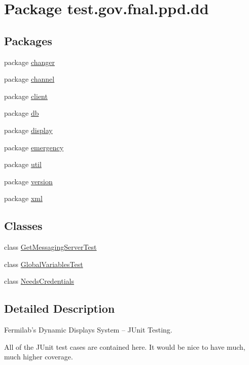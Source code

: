 \hypertarget{namespacetest_1_1gov_1_1fnal_1_1ppd_1_1dd}{\section{Package test.\-gov.\-fnal.\-ppd.\-dd}
\label{namespacetest_1_1gov_1_1fnal_1_1ppd_1_1dd}
}
\subsection*{Packages}
\begin{DoxyCompactItemize}
\item 
package \hyperlink{namespacetest_1_1gov_1_1fnal_1_1ppd_1_1dd_1_1changer}{changer}
\item 
package \hyperlink{namespacetest_1_1gov_1_1fnal_1_1ppd_1_1dd_1_1channel}{channel}
\item 
package \hyperlink{namespacetest_1_1gov_1_1fnal_1_1ppd_1_1dd_1_1client}{client}
\item 
package \hyperlink{namespacetest_1_1gov_1_1fnal_1_1ppd_1_1dd_1_1db}{db}
\item 
package \hyperlink{namespacetest_1_1gov_1_1fnal_1_1ppd_1_1dd_1_1display}{display}
\item 
package \hyperlink{namespacetest_1_1gov_1_1fnal_1_1ppd_1_1dd_1_1emergency}{emergency}
\item 
package \hyperlink{namespacetest_1_1gov_1_1fnal_1_1ppd_1_1dd_1_1util}{util}
\item 
package \hyperlink{namespacetest_1_1gov_1_1fnal_1_1ppd_1_1dd_1_1version}{version}
\item 
package \hyperlink{namespacetest_1_1gov_1_1fnal_1_1ppd_1_1dd_1_1xml}{xml}
\end{DoxyCompactItemize}
\subsection*{Classes}
\begin{DoxyCompactItemize}
\item 
class \hyperlink{classtest_1_1gov_1_1fnal_1_1ppd_1_1dd_1_1GetMessagingServerTest}{Get\-Messaging\-Server\-Test}
\item 
class \hyperlink{classtest_1_1gov_1_1fnal_1_1ppd_1_1dd_1_1GlobalVariablesTest}{Global\-Variables\-Test}
\item 
class \hyperlink{classtest_1_1gov_1_1fnal_1_1ppd_1_1dd_1_1NeedsCredentials}{Needs\-Credentials}
\end{DoxyCompactItemize}


\subsection{Detailed Description}
Fermilab's Dynamic Displays System -- J\-Unit Testing.

All of the J\-Unit test cases are contained here. It would be nice to have much, much higher coverage.